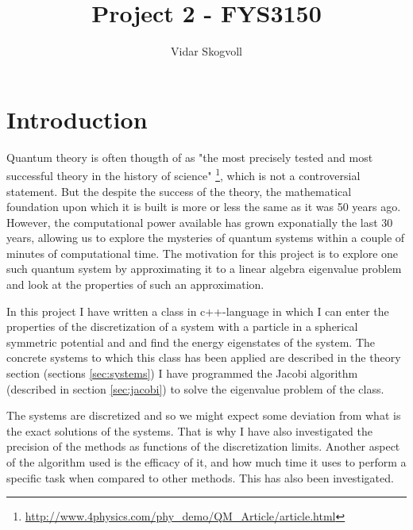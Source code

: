 \documentclass[a4paper,10pt,english]{article}
\title{Project 2 - FYS3150}
\author{Vidar Skogvoll}
\numberwithin{figure}{subsection}
\numberwithin{table}{subsection}
\numberwithin{equation}{subsection}
\begin{document}
\pagestyle{fancy}
\renewcommand{\sectionmark}[1]{\markright{#1}{}}

\pagestyle{fancy}
\renewcommand{\sectionmark}[1]{\markright{\thesection\ #1}}

\fancyhf{}
\lhead{\fancyplain{}{\rightmark }} %
\cfoot{\fancyplain{}{\thepage}}

\maketitle

\newpage
\hypersetup{linkcolor=black}
\tableofcontents
\hypersetup{linkcolor=red}
\newpage 


\section{Introduction}

Quantum theory is often thougth of as 
"the most precisely tested and most successful theory in the history of science" 
\footnote{\url{http://www.4physics.com/phy_demo/QM_Article/article.html}}, 
which is not a controversial statement. 
But the despite the success of the theory, the mathematical foundation upon which it is built is 
more or less the same as it was 50 years ago. 
However, the computational power available has grown exponatially the last 30 years, 
allowing us to explore the mysteries of quantum systems within a couple of minutes of 
computational time. 
The motivation for this project is to explore one such quantum system by approximating it 
to a linear algebra eigenvalue problem and look at the properties of such an approximation. 

In this project I have written a class in c++-language in which I can enter the properties 
of the discretization of a system with a
particle in a spherical symmetric potential and and find the energy eigenstates of the system. 
The concrete systems to which this class has been applied are described in the theory section
(sections \ref{sec:systems})
I have programmed the Jacobi algorithm (described in section \ref{sec:jacobi}) to
solve the eigenvalue problem of the class.

The systems are discretized and so we might expect some deviation from what is the 
exact solutions of the systems.
That is why I have also investigated the precision of the methods as functions 
of the discretization limits. 
Another aspect of the algorithm used is the efficacy of it, and how much time it uses 
to perform a specific task when compared to other methods. 
This has also been investigated. 
\end{document}
